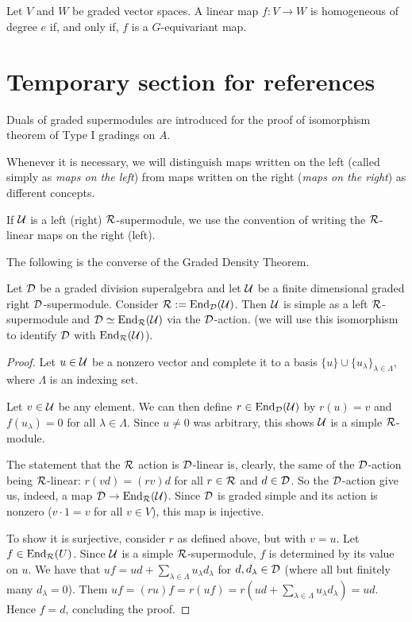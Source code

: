 \begin{prop}\label{prop:homogeneous-deg-e-widehatG}
    Let $V$ and $W$ be graded vector spaces. A linear map $f: V \to W$ is homogeneous of degree $e$ if, and only if, $f$ is a $\widehat G$-equivariant map.
\end{prop}


\section{Temporary section for references}

Duals of graded supermodules are introduced for the proof of isomorphism theorem of Type I gradings on $A$.

\begin{convention}\label{conv:maps-left-right}
    Whenever it is necessary, we will distinguish maps written on the left (called simply as \emph{maps on the left}) from maps written on the  right (\emph{maps on the right}) as different concepts.
    
    If $\mathcal U$ is a left (right) $\mathcal R$-supermodule, we use the convention of writing the $\mathcal R$-linear maps on the right (left).
\end{convention}



The following is the converse of the Graded Density Theorem.

\begin{prop}\label{prop:converse-density-thm}
    Let $\mathcal{D}$ be a graded division superalgebra and let $\mathcal U$ be a finite dimensional graded right $\mathcal{D}$-supermodule. Consider $\mathcal R := \operatorname{End}_{\mathcal{D}} (\mathcal U)$. Then $\mathcal U$ is simple as a left $\mathcal R$-supermodule and $\mathcal{D} \simeq \operatorname{End}_{\mathcal R} (\mathcal U)$ via the $\mathcal{D}$-action.
    (we will use this isomorphism to identify $\mathcal{D}$ with $\operatorname{End}_{\mathcal R} (\mathcal U)$). 
\end{prop}

\begin{proof}
Let $u \in \mathcal U$ be a nonzero vector and complete it to a basis $\{u\} \cup \{ u_\lambda\}_{\lambda \in \Lambda}$, where $\Lambda$ is an indexing set.

Let $v\in \mathcal U$ be any element. We can then define $r\in \operatorname{End}_{\mathcal{D}} (\mathcal U)$ by $r(u) = v$ and $f(u_\lambda) = 0$ for all $\lambda \in \Lambda$. Since $u \neq 0$ was arbitrary, this shows $\mathcal U$ is a simple $\mathcal R$-module. 

The statement that the $\mathcal R$ action is $\mathcal{D}$-linear is, clearly, the same of the $\mathcal{D}$-action being $\mathcal R$-linear: $r(vd) = (rv)d$ for all $r\in \mathcal R$ and $d \in \mathcal{D}$. So the $\mathcal{D}$-action give us, indeed, a map $\mathcal{D} \to \operatorname{End}_{\mathcal R} (\mathcal U)$.
Since $\mathcal{D}$ is graded simple and its action is nonzero ($v\cdot 1 = v$ for all $v \in V$), this map is injective.

To show it is surjective, consider $r$ as defined above, but with $v = u$. Let $f\in \operatorname{End}_{\mathcal R} (U)$. Since $\mathcal U$ is a simple $\mathcal R$-supermodule, $f$ is determined by its value on $u$.
We have that $uf = u d + \sum_{\lambda \in \Lambda} u_\lambda d_\lambda$ for $d, d_\lambda \in \mathcal{D}$ (where all but finitely many $d_\lambda = 0$). 
Them $ uf = (ru)f = r(uf) = r(ud + \sum_{\lambda \in \Lambda} u_\lambda d_\lambda )  = ud$. Hence $f = d$, concluding the proof.
\end{proof}

